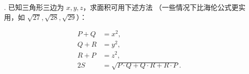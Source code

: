 \documentclass[UTF8]{ctexart}
\begin{document}
. 已知三角形三边为 $x,y,z$，求面积可用下述方法
（一些情况下比海伦公式更实用，如 $\sqrt{27},\sqrt{28},\sqrt{29}$）：

\[
\begin{aligned}
P+Q &= x^2,\\
Q+R &= y^2,\\
R+P &= z^2,\\
2S &= \sqrt{P\cdot Q+Q\cdot R+R\cdot P}.
\end{aligned}
\]
\end{document}
